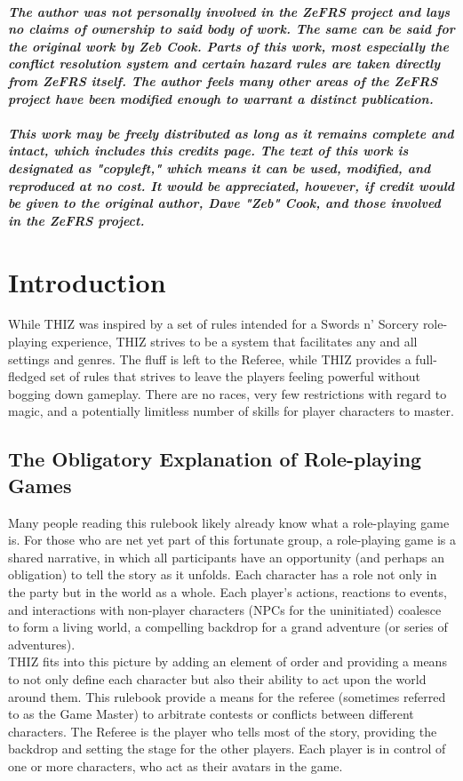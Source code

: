 \documentclass[oneside]{book}
\begin{document}
\paragraph{The author was not personally involved in the ZeFRS project and lays no claims of ownership to said body of work. The same can be said for the original work by Zeb Cook. Parts of this work, most especially the conflict resolution system and certain hazard rules are taken directly from ZeFRS itself. The author feels many other areas of the ZeFRS project have been modified enough to warrant a distinct publication. \\ \\
This work may be freely distributed as long as it remains complete and intact, which includes this credits page. The text of this work is designated as "copyleft," which means it can be used, modified, and reproduced at no cost. It would be appreciated, however, if credit would be given to the original author, Dave "Zeb" Cook, and those involved in the ZeFRS project.}

\tableofcontents

\chapter{Introduction}

While THIZ was inspired by a set of rules intended for a Swords n' Sorcery role-playing experience, THIZ strives to be a system that facilitates any and all settings and genres. The fluff is left to the Referee, while THIZ provides a full-fledged set of rules that strives to leave the players feeling powerful without bogging down gameplay. There are no races, very few restrictions with regard to magic, and a potentially limitless number of skills for player characters to master. 

\section*{The Obligatory Explanation of Role-playing Games}

Many people reading this rulebook likely already know what a role-playing game is. For those who are net yet part of this fortunate group, a role-playing game is a shared narrative, in which all participants have an opportunity (and perhaps an obligation) to tell the story as it unfolds. Each character has a role not only in the party but in 
the world as a whole. Each player's actions, reactions to events, and interactions with non-player characters (NPCs for the uninitiated) coalesce to form a living world, a compelling backdrop for a grand adventure (or series of adventures). \\
THIZ fits into this picture by adding an element of order and providing a means to not only define each character but also their ability to act upon the world around them. This rulebook provide a means for the referee (sometimes referred to as the Game Master) to arbitrate contests or conflicts between different characters. The Referee is the player who tells most of the story, providing the backdrop and setting the stage for the other players. Each player is in control of one or more characters, who act as their avatars in the game. 
\end{document}
